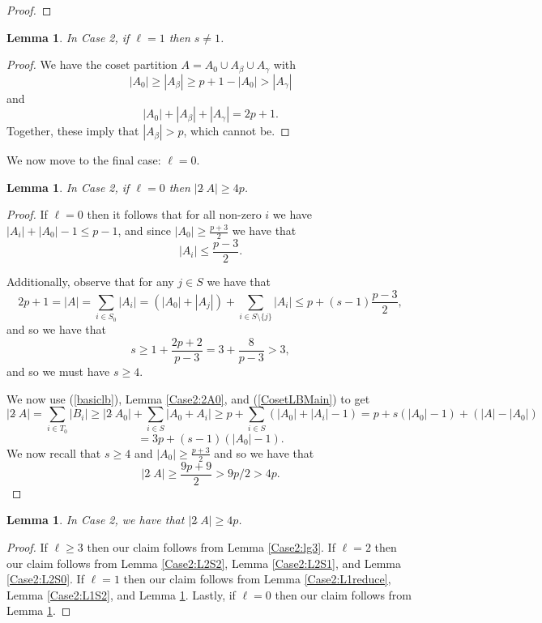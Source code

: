 \documentclass[a4paper, 12pt]{article}\usepackage[english]{babel}
\newtheorem{lem}[thm]{Lemma}
\newcommand{\<}{\langle}
\begin{document}
\begin{proof}
\end{proof}

\begin{lem}\label{Case2:L1S1}
    In Case 2, if $\ell=1$ then $s\neq 1$.
\end{lem}
\begin{proof}
    We have the coset partition $A=A_0\cup A_\beta\cup A_\gamma$ with \[|A_0|\geq |A_\beta|\geq p+1-|A_0|>|A_\gamma|\] and  \[|A_0|+|A_\beta|+|A_\gamma|=2p+1.\] Together, these imply that $|A_\beta|>p$, which cannot be.
\end{proof}
We now move to the final case: $\ell=0$.
\begin{lem}\label{Case2:L0}
  In Case 2, if $\ell=0$ then $|2\hat{\;}A|\geq 4p$.
\end{lem}
\begin{proof}
     If $\ell=0$ then it follows that for all non-zero $i$ we have $|A_i|+|A_0|-1\leq p-1$, and since $|A_0|\geq \frac{p+3}{2}$ we have that \[|A_i|\leq \frac{p-3}{2}.\] 

    Additionally, observe that for any $j\in S$ we have that \[2p+1=|A|=\sum_{i\in S_0}|A_i|=(|A_0|+|A_j|)+\sum_{i\in S\setminus \{j\}}|A_i|\leq p+(s-1)\frac{p-3}{2},\] and so we have that 
    \[s\geq 1+\frac{2p+2}{p-3}=3+\frac{8}{p-3}>3,\] and so we must have $s\geq 4$.

    We now use (\ref{basiclb}), Lemma \ref{Case2:2A0}, and (\ref{CosetLBMain}) to get \[|2\hat{\;}A|=\sum_{i\in T_0}|B_i|\geq |2\hat{\;}A_0|+ \sum_{i\in S}|A_0+A_i|\geq p+\sum_{i\in S}(|A_0|+|A_i|-1)=p+s(|A_0|-1)+(|A|-|A_0|)\]
    \[=3p+(s-1)(|A_0|-1).\]
    We now recall that $s\geq 4$ and $|A_0|\geq \frac{p+3}{2}$ and so we have that \[|2\hat{\;}A|\geq \frac{9p+9}{2}> 9p/2>4p.\]
\end{proof}

\begin{lem}
    In Case 2, we have that $|2\hat{\;}A|\geq 4p$.
\end{lem}
\begin{proof}
    If $\ell\geq 3$ then our claim follows from Lemma \ref{Case2:lg3}. If $\ell=2$ then our claim follows from Lemma \ref{Case2:L2S2}, Lemma \ref{Case2:L2S1}, and Lemma \ref{Case2:L2S0}. If $\ell=1$ then our claim follows from Lemma \ref{Case2:L1reduce}, Lemma \ref{Case2:L1S2}, and Lemma \ref{Case2:L1S1}. Lastly, if $\ell=0$ then our claim follows from Lemma \ref{Case2:L0}.
\end{proof}
\end{document}
